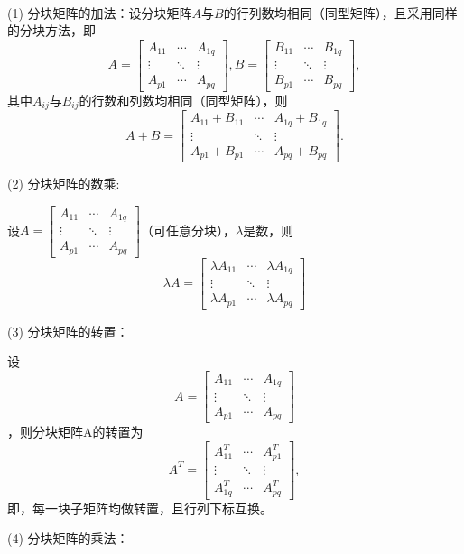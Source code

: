 \begin{prop}[分块矩阵的运算]\

\enum
\item[(1)] 分块矩阵的加法：设分块矩阵$A$与$B$的行列数均相同（同型矩阵），且采用同样的分块方法，即
$$A = \begin{bmatrix}
A_{11} & \cdots & A_{1q} \\
\vdots & \ddots & \vdots \\
A_{p1} & \cdots & A_{pq}
\end{bmatrix},
B = \begin{bmatrix}
B_{11} & \cdots & B_{1q} \\
\vdots & \ddots & \vdots \\
B_{p1} & \cdots & B_{pq}
\end{bmatrix},
$$
其中$A_{ij}$与$B_{ij}$的行数和列数均相同（同型矩阵），则
$$A + B = \begin{bmatrix}
A_{11} + B_{11} & \cdots & A_{1q} + B_{1q}\\
\vdots & \ddots & \vdots \\
A_{p1} + B_{p1} & \cdots & A_{pq} + B_{pq}
\end{bmatrix}.
$$
\item[(2)] 分块矩阵的数乘:

设$A = \begin{bmatrix}
A_{11} & \cdots & A_{1q} \\
\vdots & \ddots & \vdots \\
A_{p1} & \cdots & A_{pq}
\end{bmatrix}$（可任意分块），$\lambda$是数，则
$$\lambda A = \begin{bmatrix}
\lambda A_{11} & \cdots & \lambda A_{1q} \\
\vdots & \ddots & \vdots \\
\lambda A_{p1} & \cdots & \lambda A_{pq}
\end{bmatrix}$$
\item[(3)] 分块矩阵的转置：

设$$A = \begin{bmatrix}
A_{11} & \cdots & A_{1q} \\
\vdots & \ddots & \vdots \\
A_{p1} & \cdots & A_{pq}
\end{bmatrix}$$，则分块矩阵A的转置为
$$A^T = \begin{bmatrix}
A_{11}^T & \cdots & A_{p1}^T \\
\vdots & \ddots & \vdots \\
A_{1q}^T & \cdots & A_{pq}^T
\end{bmatrix},$$
即，每一块子矩阵均做转置，且行列下标互换。
\item[(4)] 分块矩阵的乘法：


\end{prop}
